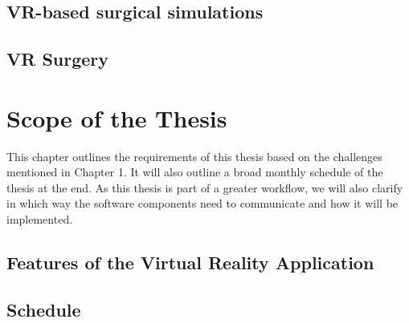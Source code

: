 \documentclass[twoside, parskip]{VRThesis} %
\begin{document}
\section{\label{sec::RelatedWork1}VR-based surgical simulations}


\section{\label{sec::RelatedWork3}VR Surgery}


\chapter{Scope of the Thesis}

This chapter outlines the requirements of this thesis based on the challenges mentioned in Chapter 1.
It will also outline a broad monthly schedule of the thesis at the end.
As this thesis is part of a greater workflow, we will also clarify in which way the software components need to communicate and how it will be implemented.

\section{\label{sec::Features}Features of the Virtual Reality Application}


\section{Schedule}




%
\end{document}
